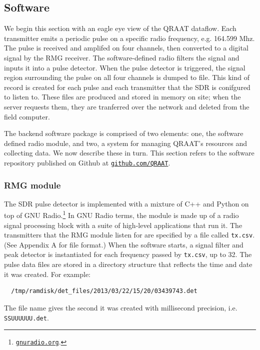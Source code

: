 \documentclass[letter]{article}
\newcounter{foot}
\begin{document}
\subsection{Software}
We begin this section with an eagle eye view of the QRAAT dataflow. Each transmitter emits 
a periodic pulse on a specific radio frequency, e.g. 164.599 Mhz. The pulse is received and
amplifed on four channels, then converted to a digital signal by the RMG receiver.
The software-defined radio filters the signal and inputs it into a pulse detector. When the 
pulse detector is triggered, the signal region surrounding the pulse on all four channels
is dumped to file. This kind of record is created for each pulse and each transmitter
that the SDR is conifgured to listen to. These files are produced and stored in memory 
on site; when the server requests them, they are tranferred over the network and deleted from
the field computer. 

The backend software package is comprised of two elements: one, the software defined radio 
module, and two, a system for managing QRAAT's resources and collecting data. We now describe 
these in turn. This section refers to the software repository published on Github at 
\href{http://github.com/QRAAT/QRAAT/}{\tt github.com/QRAAT}.

\subsubsection{RMG module}
The SDR pulse detector is implemented with a mixture of C++ and Python on top of 
GNU Radio.\footnote{\href{http://gnuradio.org/redmine/}{\tt gnuradio.org}.} 
In GNU Radio terms, the module is made up of a radio signal processing block with a suite 
of high-level applications that run it. The transmitters that the RMG module listen for
are specified by a file called \texttt{tx.csv}. (See Appendix A for file format.) When 
the software starts, a signal filter and peak detector is instantiated for each 
frequency passed by \texttt{tx.csv}, up to 32. The pulse data files are stored in a 
directory structure that reflects the time and date it was created. For example: 
\begin{verbatim}
  /tmp/ramdisk/det_files/2013/03/22/15/20/03439743.det
\end{verbatim}
The file name gives the second it was created with millisecond precision, i.e. 
\texttt{SSUUUUUU.det}.
\end{document}
